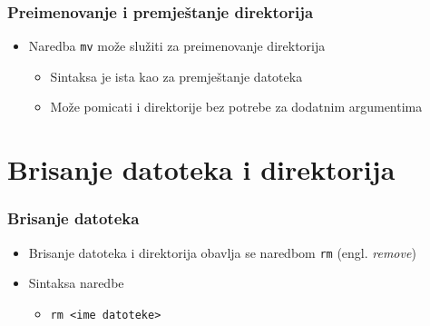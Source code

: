 \documentclass{beamer}
\begin{document}
\begin{frame}[t]
\frametitle{Preimenovanje i premještanje direktorija}
\begin{itemize}
  \item Naredba \texttt{mv} može služiti za preimenovanje direktorija
  \begin{itemize}
    \item Sintaksa je ista kao za premještanje datoteka
    \item Može pomicati i direktorije bez potrebe za dodatnim argumentima
  \end{itemize}
\end{itemize}
\end{frame}

\section{Brisanje datoteka i direktorija}
\begin{frame}[t]
\frametitle{Brisanje datoteka}
\begin{itemize}
  \item Brisanje datoteka i direktorija obavlja se naredbom \texttt{rm}
        (engl. \emph{remove})
  \item Sintaksa naredbe
  \begin{itemize}
    \item[] \texttt{rm \textless ime datoteke\textgreater}
  \end{itemize}
\end{itemize}
\end{frame}
\end{document}
